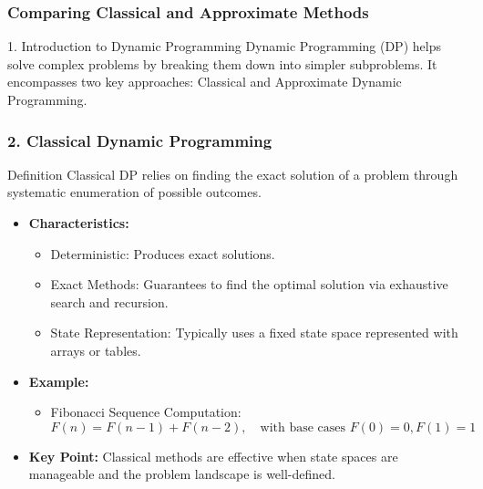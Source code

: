\documentclass[aspectratio=169]{beamer}
\begin{document}
\begin{frame}[fragile]
  \frametitle{Comparing Classical and Approximate Methods}
  
  \begin{block}{1. Introduction to Dynamic Programming}
    Dynamic Programming (DP) helps solve complex problems by breaking them down into simpler subproblems. It encompasses two key approaches: Classical and Approximate Dynamic Programming.
  \end{block}
\end{frame}

\begin{frame}[fragile]
  \frametitle{2. Classical Dynamic Programming}
  
  \begin{block}{Definition}  
    Classical DP relies on finding the exact solution of a problem through systematic enumeration of possible outcomes.
  \end{block}

  \begin{itemize}
    \item \textbf{Characteristics:}
    \begin{itemize}
      \item Deterministic: Produces exact solutions.
      \item Exact Methods: Guarantees to find the optimal solution via exhaustive search and recursion.
      \item State Representation: Typically uses a fixed state space represented with arrays or tables.
    \end{itemize}
    
    \item \textbf{Example:}
    \begin{itemize}
      \item Fibonacci Sequence Computation:
      \begin{equation*}
      F(n) = F(n-1) + F(n-2), \quad \text{with base cases } F(0) = 0, F(1) = 1
      \end{equation*}
    \end{itemize}
    
    \item \textbf{Key Point:} 
    Classical methods are effective when state spaces are manageable and the problem landscape is well-defined.
  \end{itemize}
\end{frame}
\end{document}
